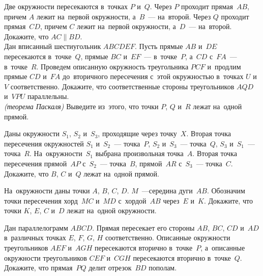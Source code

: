 \begin{problems}

\item
\subproblem
Две окружности пересекаются в~точках $P$ и~$Q$.
Через $P$ проходит прямая~$AB$, причем $A$ лежит на~первой окружности,
а~$B$~--- на~второй.
Через $Q$ проходит прямая~$CD$, причем $C$ лежит на~первой окружности,
а~$D$~--- на~второй.
Докажите, что $AC \parallel BD$.
\\
\subproblem
Дан вписанный шестиугольник $ABCDEF$.
Пусть прямые $AB$ и~$DE$ пересекаются в~точке~$Q$, прямые $BC$ и~$EF$~---
в~точке~$P$, а~$CD$ с~$FA$~--- в~точке~$R$.
Проведем описанную окружность треугольника $PCF$ и~продлим прямые $CD$ и~$FA$
до~вторичного пересечения с~этой окружностью в~точках $U$ и~$V$ соответственно.
Докажите, что соответственные стороны треугольников $AQD$ и~$VPU$ параллельны.
\\
\subproblem\emph{(теорема Паскаля)}
Выведите из~этого, что точки $P$, $Q$ и~$R$ лежат на~одной прямой.

\item
Даны окружности $S_1$, $S_2$ и~$S_3$, проходящие через точку~$X$.
Вторая точка пересечения окружностей $S_1$ и~$S_2$~--- точка~$P$,
$S_2$ и~$S_3$~--- точка~$Q$, $S_3$ и~$S_1$~--- точка~$R$.
На~окружности~$S_1$ выбрана произвольная точка~$A$.
Вторая точка пересечения прямой~$AP$ с~$S_2$~--- точка~$B$,
прямой~$AR$ с~$S_3$~--- точка~$C$.
Докажите, что $B$, $C$ и~$Q$ лежат на~одной прямой.

\item
На~окружности даны точки $A$, $B$, $C$, $D$.
$M$~---середина дуги~$AB$.
Обозначим точки пересечения хорд~$MC$ и~$MD$ с~хордой~$AB$ через~$E$ и~$K$.
Докажите, что точки $K$, $E$, $C$ и~$D$ лежат на~одной окружности.

\item
Дан параллелограмм $ABCD$.
Прямая пересекает его стороны $AB$, $BC$, $CD$ и~$AD$ в~различных точках
$E$, $F$, $G$, $H$ соответственно.
Описанные окружности треугольников $AEF$ и~$AGH$ пересекаются вторично
в~точке~$P$, а~описанные окружности треугольников $CEF$ и~$CGH$ пересекаются
вторично в~точке~$Q$.
Докажите, что прямая~$PQ$ делит отрезок~$BD$ пополам.



\end{problems}

